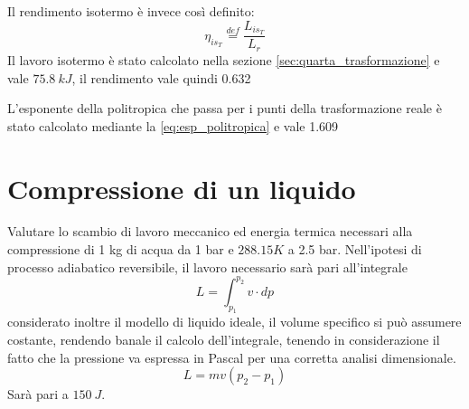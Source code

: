 \documentclass[a4paper,12pt]{article}
\begin{document}
Il rendimento isotermo è invece così definito:
\begin{equation}
    \label{eq:rendimento_isotermo}
    \eta_{is_T} \stackrel{def}{=} \frac{L_{is_T}}{L_r}
\end{equation}
Il lavoro isotermo è stato calcolato nella sezione \ref{sec:quarta_trasformazione} e vale $75.8\ kJ$, il rendimento
vale quindi 0.632

L'esponente della politropica che passa per i punti della trasformazione reale è stato calcolato mediante 
la \eqref{eq:esp_politropica} e vale 1.609

\section{Compressione di un liquido}
\label{sec:compressione_liquido}
Valutare lo scambio di lavoro meccanico ed energia termica necessari alla compressione di 1 kg di acqua da
1 bar e $288.15 K$ a 2.5 bar.
Nell'ipotesi di processo adiabatico reversibile, il lavoro necessario sarà pari all'integrale 
\begin{equation}
    L = \int_{p_1}^{p_2} v\cdot dp
\end{equation}
considerato inoltre il modello di liquido ideale, il volume specifico si può assumere costante, rendendo banale
il calcolo dell'integrale, tenendo in considerazione il fatto che la pressione va espressa in Pascal
per una corretta analisi dimensionale.
\begin{equation}
    L = mv(p_2-p_1)
\end{equation}
Sarà pari a $150\ J$.
\end{document}
